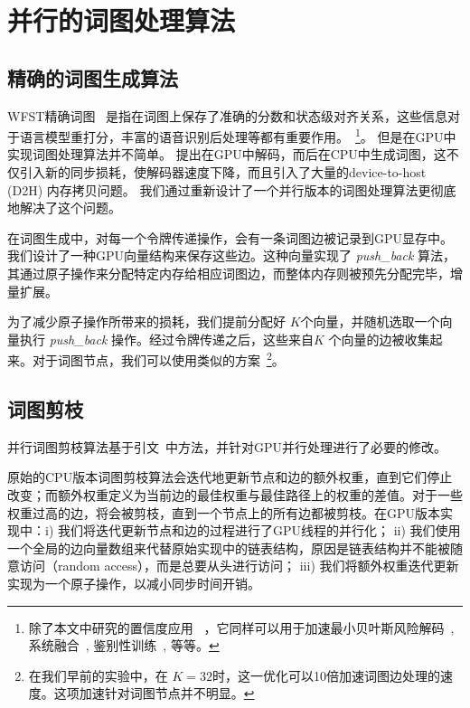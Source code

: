 \section{并行的词图处理算法}
\label{sec:lat-gen}


\subsection{精确的词图生成算法}
WFST精确词图~\cite{povey2012generating} 是指在词图上保存了准确的分数和状态级对齐关系，这些信息对于语言模型重打分，丰富的语音识别后处理等都有重要作用。~\footnote{除了本文中研究的置信度应用~\cite{mangu1999finding} ，它同样可以用于加速最小贝叶斯风险解码~\cite{goel2000minimum},
系统融合~\cite{fiscus1997post}, 鉴别性训练~\cite{povey2005discriminative}, 等等。 }。 %
但是在GPU中实现词图处理算法并不简单。
\cite{kim2014accelerating} 提出在GPU中解码，而后在CPU中生成词图，这不仅引入新的同步损耗，使解码器速度下降，而且引入了大量的device-to-host (D2H) 内存拷贝问题。
我们通过重新设计了一个并行版本的词图处理算法\cite{povey2012generating}更彻底地解决了这个问题。


在词图生成中，对每一个令牌传递操作，会有一条词图边被记录到GPU显存中。我们设计了一种GPU向量结构来保存这些边。这种向量实现了  {\em{push\_back}} 算法，其通过原子操作来分配特定内存给相应词图边，而整体内存则被预先分配完毕，增量扩展。

为了减少原子操作所带来的损耗，我们提前分配好 $K$个向量，并随机选取一个向量执行 {\em{push\_back}} 操作。经过令牌传递之后，这些来自$K$ 个向量的边被收集起来。对于词图节点，我们可以使用类似的方案~\footnote{在我们早前的实验中，在 $K=32$时，这一优化可以10倍加速词图边处理的速度。这项加速针对词图节点并不明显。}。



\subsection{词图剪枝}

并行词图剪枝算法基于引文~\cite{ljolje1999efficient,povey2012generating}中方法，并针对GPU并行处理进行了必要的修改。

原始的CPU版本词图剪枝算法会迭代地更新节点和边的额外权重，直到它们停止改变；而额外权重定义为当前边的最佳权重与最佳路径上的权重的差值。对于一些权重过高的边，将会被剪枝，直到一个节点上的所有边都被剪枝。在GPU版本实现中：i) 我们将迭代更新节点和边的过程进行了GPU线程的并行化；
ii) 我们使用一个全局的边向量数组来代替原始实现中的链表结构，原因是链表结构并不能被随意访问（random access），而是总要从头进行访问；
iii) 我们将额外权重迭代更新实现为一个原子操作，以减小同步时间开销。

